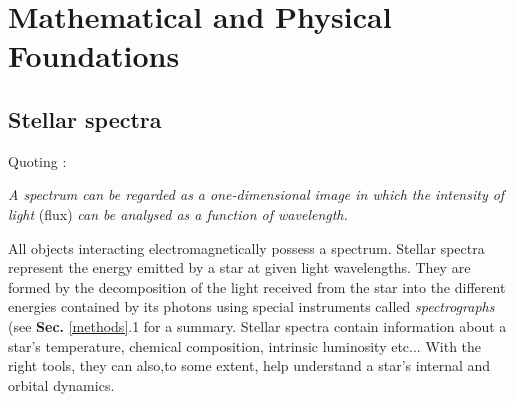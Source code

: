 \chapter{Mathematical and Physical Foundations}
\label{theory}
    \section{Stellar spectra}
    Quoting \cite{Hearnshaw2014TheStarlight}: 
    
    \noindent \guillemotleft \textit{A spectrum can be regarded as a one-dimensional image in which the intensity of light} (flux) \textit{can be analysed as a function of wavelength.} \guillemotright 

    \noindent All objects interacting electromagnetically possess a spectrum. Stellar spectra represent the energy emitted by a star at given light wavelengths. They are formed by the decomposition of the light received from the star into the different energies contained by its photons using special instruments called \textit{spectrographs} (see \textbf{Sec.} \ref{methods}.1 for a summary. Stellar spectra contain information about a star's temperature, chemical composition, intrinsic luminosity etc... With the right tools, they can also,to some extent, help understand a star's internal and orbital dynamics.
    
